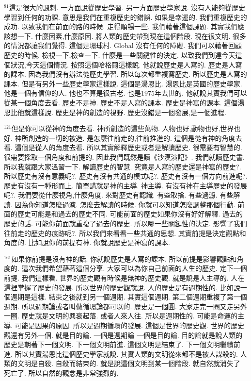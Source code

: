\documentclass{book}
\begin{document}
$^{81}$這是很大的諷刺.
一方面說從歷史學習.
另一方面歷史學家說.
沒有人能夠從歷史學習到任何的功課.
意思是我們在重複歷史的錯誤.
如果是幸運的.
我們重複歷史的成功.
以致我們在前面的路的時候.
走得順暢一些.
我們藉著這個課題.
其實我們應該想一下.
什麼因素,什麼原因.
將人類的歷史帶到現在這個階段.
現在很文明.
很多的情況都讓我們覺得.
這個是環球村.
Global 沒有任何的障礙.
我們可以藉著回顧歷史的時候.
檢視一下,檢查一下.
什麼是一些關鍵性的決定.
以致我們到達今天這個狀況,今天這個情況.
按照這個哈格爾這樣說.
他就說歷史是人寫的.
歷史是人寫的課本.
因為我們沒有辦法從歷史學習.
所以每次都重複寫歷史.
所以歷史是人寫的課本.
但是有另外一些歷史學家這樣說.
這個是湯恩比.
湯恩比是英國的歷史學家.
他是一個有信仰的人.
他也不算是很古老.
也是1975年去世的.
他就說其實我們可以從某一個角度去看.
歷史不是神.
歷史不是人寫的課本.
歷史是神寫的課本.
這個湯恩比他就這樣說.
歷史是神的創造的視野.
歷史沒錯是一個發展,是一個進程.

$^{121}$但是你可以從神的角度去看.
神所創造的這些萬物.
人物也好,動物也好,世界也好.
神所創造的一切的被造.
是怎麼往前走的,往前推進的.
這個是從有神的角度去看.
這個是從人的角度去看.
所以其實解釋歷史或者是解讀歷史.
很需要有智慧的.
很需要採取一個角度和前提的.
因此我們既然是讀《沙漠演記》.
我們就讀歷史書.
所以我就跟大家溫習一下.
解讀歷史的智慧.
究竟是人寫的歷史還是神寫的歷史?.
所以歷史有沒有意義呢?.
歷史有沒有共通的模式呢?.
歷史有沒有一個方向前進呢?.
歷史有沒有一種形而上.
簡單講就是神的主導.
神主導.
有沒有神在主導歷史的發展呢?.
我們要從什麼視角,什麼角度.
來對歷史有認識.
有些取捨.
有些過濾.
有些解讀.
因為你知道怎麼過濾.
怎麼去解讀的時候.
你就可以知道怎麼調整那個行動.
前面的歷史可能是和過去的歷史不同.
可能前面的歷史如果你沒有好好解釋.
過去的歷史的話.
可能你前面就重複了過去的歷史.
所以哪一些關鍵性的決定.
影響了我們往前走的歷史的痕跡呢?.
所以我們來看看一些共通的思想.
其實前提是決定觀點和角度的.
比如說你的前提有神.
你就說歷史是神寫的課本.

$^{161}$如果你前提是沒有神的話.
你就說歷史是人寫的課本.
所以前提是影響觀點和角度的.
這次我們希望藉著這個分享.
大家可以為你自己前面的人生的歷史.
定下一個前提.
我們這樣看.
世界的歷史觀有時候是無神的歷史觀.
就是說是人主導的.
人在這裡掌握了歷史的發展.
所以世界的歷史觀就說.
人的歷史是有週期性的.
比如說一個週期是這樣.
結束之後就到另一個週期.
其實這個週期.
第二個週期重複了第一個週期.
所以週期論或者叫做循環論都可以的.
歷史是一個圓.
大家走完一圈又走另外一圈.
歷史就是文明的興衰起落.
或者人來人往.
所以是週期性的.
可能是命運的主導.
可能是因果的原因.
所以是週期循環的發展.
這個是世界的歷史觀.
世界的歷史觀還有另外一個.
就是目的論.
一個是週期論 一個是目的論.
目的論就是說人類的歷史是朝著下一個文明.
下一個文明前進.
這個文明是結束了.
下一個文明繼續前進.
所以其實湯恩比這個歷史學家就說.
其實人類的文明從來都不是被人謀殺的.
人類的文明是自殺.
自殺而結束的.
就是說這個文明到某一個階段.
就自然就消失了 死亡了.
所以自然的觀念是非常強烈的.
\end{document}
